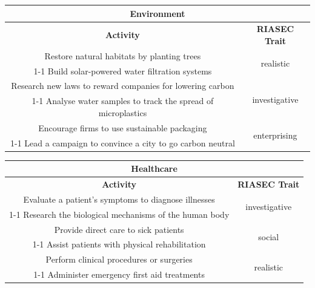 \begin{table}[H]
\centering
\begin{tabular}{|c|c|}
\hline
\multicolumn{2}{|c|}{\textbf{Environment}}\\
\hline
\hline
\textbf{Activity} & \textbf{RIASEC Trait}\\
\hline
Restore natural habitats by planting trees & \multirow{2}{*}{realistic}\\
\cline{1-1}
Build solar-powered water filtration systems & \\
\hline
Research new laws to reward companies for lowering carbon & \multirow{2}{*}{investigative}\\
\cline{1-1}
Analyse water samples to track the spread of microplastics & \\
\hline
Encourage firms to use sustainable packaging & \multirow{2}{*}{enterprising}\\
\cline{1-1}
Lead a campaign to convince a city to go carbon neutral & \\
\hline
\end{tabular}
\end{table}

\begin{table}[H]
\centering
\begin{tabular}{|c|c|}
\hline
\multicolumn{2}{|c|}{\textbf{Healthcare}}\\
\hline
\hline
\textbf{Activity} & \textbf{RIASEC Trait}\\
\hline
Evaluate a patient's symptoms to diagnose illnesses & \multirow{2}{*}{investigative}\\
\cline{1-1}
Research the biological mechanisms of the human body & \\
\hline
Provide direct care to sick patients & \multirow{2}{*}{social}\\
\cline{1-1}
Assist patients with physical rehabilitation & \\
\hline
Perform clinical procedures or surgeries & \multirow{2}{*}{realistic}\\
\cline{1-1}
Administer emergency first aid treatments & \\
\hline
\end{tabular}
\end{table}

